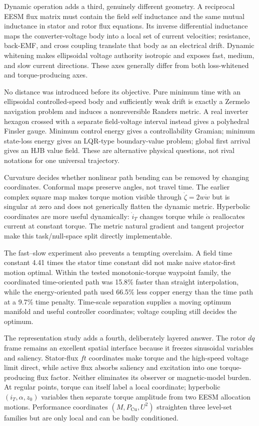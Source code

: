 Dynamic operation adds a third, genuinely different geometry. A reciprocal
EESM flux matrix must contain the field self inductance and the same mutual
inductance in stator and rotor flux equations. Its inverse differential
inductance maps the converter-voltage body into a local set of current
velocities; resistance, back-EMF, and cross coupling translate that body as an
electrical drift. Dynamic whitening makes ellipsoidal voltage authority
isotropic and exposes fast, medium, and slow current directions. These axes
generally differ from both loss-whitened and torque-producing axes.

No distance was introduced before its objective. Pure minimum time with an
ellipsoidal controlled-speed body and sufficiently weak drift is exactly a
Zermelo navigation problem and induces a nonreversible Randers metric. A real
inverter hexagon crossed with a separate field-voltage interval instead gives
a polyhedral Finsler gauge. Minimum control energy gives a controllability
Gramian; minimum state-loss energy gives an LQR-type boundary-value problem;
global first arrival gives an HJB value field. These are alternative physical
questions, not rival notations for one universal trajectory.

Curvature decides whether nonlinear path bending can be removed by changing
coordinates. Conformal maps preserve angles, not travel time. The earlier
complex square map makes torque motion visible through
\(\dot\zeta=2w\dot w\) but is singular at zero and does not generically flatten
the dynamic metric. Hyperbolic coordinates are more useful dynamically:
\(\dot i_T\) changes torque while \(\dot\alpha\) reallocates current at
constant torque. The metric natural gradient and tangent projector make this
task/null-space split directly implementable.

The fast--slow experiment also prevents a tempting overclaim. A field time
constant 4.41 times the stator time constant did not make naive stator-first
motion optimal. Within the tested monotonic-torque waypoint family, the
coordinated time-oriented path was 15.8\% faster than straight interpolation,
while the energy-oriented path used 66.5\% less copper energy than the time
path at a 9.7\% time penalty. Time-scale separation supplies a moving optimum
manifold and useful controller coordinates; voltage coupling still decides
the optimum.

The representation study adds a fourth, deliberately layered answer. The
rotor \(dq\) frame remains an excellent spatial interface because it freezes
sinusoidal variables and saliency. Stator-flux \(ft\) coordinates make torque
and the high-speed voltage limit direct, while active flux absorbs saliency
and excitation into one torque-producing flux factor. Neither eliminates its
observer or magnetic-model burden. At regular points, torque can itself label
a local coordinate; hyperbolic \((i_T,\alpha,z_0)\) variables then separate
torque amplitude from two EESM allocation motions. Performance coordinates
\((M,P_{\mathrm{Cu}},U^2)\) straighten three level-set families but are only
local and can be badly conditioned.

